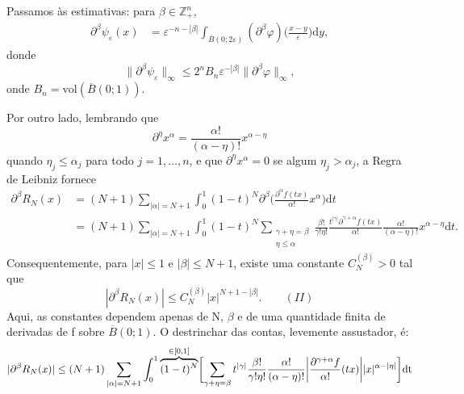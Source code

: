\documentclass[../distribution_theory_notes.tex]{subfiles}
\begin{document}
\begin{proof*}
	Passamos às estimativas: para \(\beta \in \mathbb{Z}_{+}^{n}\),
	\begin{align*}
		\partial^{\beta }\psi_{\varepsilon }(x)
		 & =\varepsilon^{-n-|\beta |}\int_{\overline{B}(0;2\varepsilon )}^{}(\partial^{\beta }\varphi )\biggl(\frac{x-y}{\varepsilon }\biggr)\mathrm{d}y,
	\end{align*}
	donde
	\[
		\|\partial^{\beta }\psi_{\varepsilon }\|_{\infty }
		\leq 2^{n}B_{n}\varepsilon^{-|\beta |}\|\partial^{\beta }\varphi \|_{\infty },
	\]
	onde \(B_{n}=\mathrm{vol}(\overline{B}(0;1))\).

	Por outro lado, lembrando que
	\[
		\partial^{\eta }x^{\alpha }
		=\frac{\alpha !}{(\alpha -\eta )!}x^{\alpha -\eta }
	\]
	quando \(\eta_{j}\leq \alpha_{j}\) para todo \(j=1,\dotsc ,n\), e que \(\partial^{\eta }x^{\alpha }=0\) se algum \(\eta_{j}>\alpha_{j}\), a Regra de Leibniz fornece
	\begin{align*}
		\partial^{\beta }R_{N}(x)
		 & =(N+1)\sum\limits_{|\alpha |=N+1}^{}\int_{0}^{1}(1-t)^{N}\partial^{\beta }\biggl(\frac{\partial^{\alpha }f(tx)}{\alpha !}x^{\alpha }\biggr)\mathrm{d}t \\
		 & =(N+1)\sum\limits_{|\alpha |=N+1}^{}\int_{0}^{1}(1-t)^{N}
		\sum\limits_{\substack{\gamma +\eta =\beta                                                                                                                \\ \eta \leq \alpha }}^{}
		\frac{\beta !}{\gamma !\eta !}\frac{t^{|\gamma |}\partial^{\gamma +\alpha }f(tx)}{\alpha !}
		\frac{\alpha !}{(\alpha -\eta )!}x^{\alpha -\eta }\mathrm{d}t.
	\end{align*}
	Consequentemente, para \(|x|\leq 1\) e \(|\beta |\leq N+1\), existe uma constante \(C_{N}^{(\beta )}>0\) tal que
	\[
		|\partial^{\beta }R_{N}(x)|\leq C_{N}^{(\beta )}|x|^{N+1-|\beta |}. \qquad (II)
	\]
	Aqui, as constantes dependem apenas de N, \(\beta \) e de uma quantidade finita de derivadas de f sobre \(\overline{B}(0;1)\).
	O destrinchar das contas, levemente assustador, é:
	\begin{align*}
		 & | \partial^{\beta }R_{N}(x) | \leq (N+1)\sum\limits_{| \alpha  |=N+1}^{}\int_{0}^{1}\overbrace{(1-t)^{N}}^{\mathclap{\in[0, 1]}}\biggl[\sum\limits_{\gamma +\eta =\beta }^{}t^{| \gamma  |}\frac{\beta !}{\gamma !\eta !}\frac{\alpha !}{(\alpha -\eta )!}\biggl\vert \frac{\partial^{\gamma +\alpha }f}{\alpha !}(tx) \biggr\vert | x |^{\alpha - | \eta  |}\biggr] \mathrm{dt}                                                                                             \\

\end{align*}
\end{proof*}
\end{document}
